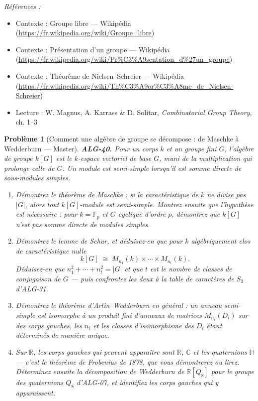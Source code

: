 \documentclass[11pt]{article}
\newtheorem{problem}{Problème}
\newenvironment{refs}{\par\small\noindent\emph{Références :}\begin{itemize}\setlength\itemsep{0pt}}{\end{itemize}\normalsize}
\begin{document}
\begin{refs}
\item Contexte : Groupe libre --- Wikipédia (\url{https://fr.wikipedia.org/wiki/Groupe_libre})
\item Contexte : Présentation d'un groupe --- Wikipédia (\url{https://fr.wikipedia.org/wiki/Pr%C3%A9sentation_d%27un_groupe})
\item Contexte : Théorème de Nielsen--Schreier --- Wikipédia (\url{https://fr.wikipedia.org/wiki/Th%C3%A9or%C3%A8me_de_Nielsen-Schreier})
\item Lecture : W. Magnus, A. Karrass \& D. Solitar, \textit{Combinatorial Group Theory}, ch. 1--3
\end{refs}

\bigskip

\begin{problem}[{Comment une algèbre de groupe se décompose : de Maschke à Wedderburn --- Master}]
\textbf{ALG-40.} Pour un corps $k$ et un groupe fini $G$, l'algèbre de groupe $k[G]$ est le
$k$-espace vectoriel de base $G$, muni de la multiplication qui prolonge celle de $G$. Un module est
\textit{semi-simple} lorsqu'il est somme directe de sous-modules simples.
\begin{enumerate}
\item[(a)] Démontrez le théorème de Maschke : si la caractéristique de $k$ ne divise pas $|G|$, alors tout
$k[G]$-module est semi-simple. Montrez ensuite que l'hypothèse est nécessaire : pour $k = \mathbb{F}_p$ et
$G$ cyclique d'ordre $p$, démontrez que $k[G]$ n'est pas somme directe de modules simples.
\item[(b)] Démontrez le lemme de Schur, et déduisez-en que pour $k$ algébriquement clos de caractéristique nulle
\[ k[G] \;\cong\; M_{n_1}(k) \times \cdots \times M_{n_t}(k). \]
Déduisez-en que $n_1^2 + \cdots + n_t^2 = |G|$ et que $t$ est le nombre de classes de conjugaison de
$G$ --- puis confrontez les deux à la table de caractères de $S_3$ d'ALG-31.
\item[(c)] Démontrez le théorème d'Artin--Wedderburn en général : un anneau semi-simple est isomorphe à un
produit fini d'anneaux de matrices $M_{n_i}(D_i)$ sur des corps gauches, les $n_i$ et les classes
d'isomorphisme des $D_i$ étant déterminés de manière unique.
\item[(d)] Sur $\mathbb{R}$, les corps gauches qui peuvent apparaître sont $\mathbb{R}$, $\mathbb{C}$ et
les quaternions $\mathbb{H}$ --- c'est le théorème de Frobenius de 1878, que vous démontrerez ou lirez.
Déterminez ensuite la décomposition de Wedderburn de $\mathbb{R}[Q_8]$ pour le groupe des quaternions
$Q_8$ d'ALG-07, et identifiez les corps gauches qui y apparaissent.
\end{enumerate}

\end{problem}
\end{document}

